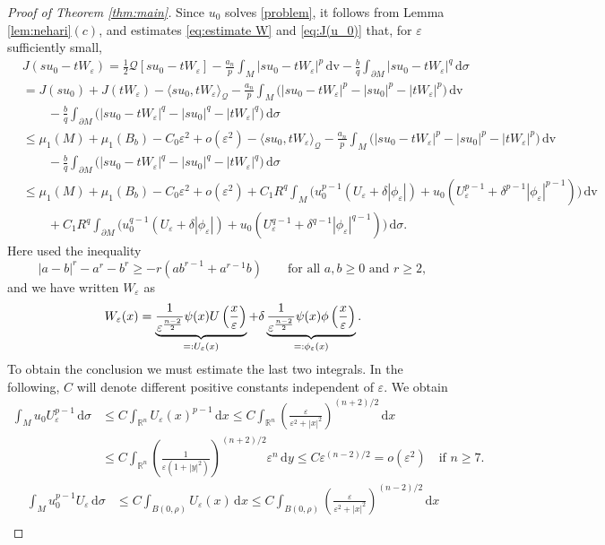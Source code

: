 \documentclass[reqno,11pt,oneside]{amsart}
\numberwithin{equation}{section}
\def\r{\mathbb{R}}
\def\eps{\varepsilon}
\def\im{\int_{M}}
\def\idm{\int_{\partial M}}
\def\d{\,\mathrm{d}}
\def\dv{\,\mathrm{dv}}
\begin{document}
\begin{proof}[Proof of Theorem \ref{thm:main}]
Since $u_0$ solves \eqref{problem}, it follows from Lemma \ref{lem:nehari}$(c)$, and estimates \eqref{eq:estimate W} and \eqref{eq:J(u_0)} that, for $\eps$ sufficiently small,
\begin{align} \label{eq:energy}
&J(su_0-tW_\eps)=\frac{1}{2}\mathscr{Q}[su_0-tW_\eps]-\frac{a_n}{p}\im|su_0-tW_\eps|^p\dv-\frac{b}{q}\idm|su_0-tW_\eps|^q\d\sigma \nonumber \\
&=J(su_0)+J(tW_\eps)-\langle su_0,tW_\eps\rangle_\mathscr{Q}-\frac{a_n}{p}\im\Big(|su_0-tW_\eps|^p-|su_0|^p-|tW_\eps|^p\Big)\dv\nonumber\\
&\qquad-\frac{b}{q}\idm\Big(|su_0-tW_\eps|^q-|su_0|^q-|tW_\eps|^q\Big)\d\sigma  \nonumber \\
&\leq \mu_1(M)+\mu_1(B_b)-C_0\eps^2+o(\eps^2)-\langle su_0,tW_\eps\rangle_\mathscr{Q}-\frac{a_n}{p}\im\Big(|su_0-tW_\eps|^p-|su_0|^p-|tW_\eps|^p\Big)\dv\nonumber\\
&\qquad
-\frac{b}{q}\idm\Big(|su_0-tW_\eps|^q-|su_0|^q-|tW_\eps|^q\Big)\d\sigma\nonumber \\
&\leq  \mu_1(M)+\mu_1(B_b)-C_0\eps^2+o(\eps^2) +C_1R^q
\im\Big(u_0^{p-1}(U_\eps +\delta|\phi_\eps|)+u_0\left(U_\eps^{p-1}+\delta^{p-1}|\phi_\eps|^{p-1}\right)\Big)\dv\nonumber\\
&\qquad+C_1R^q
\idm\Big(u_0^{q-1}(U_\eps +\delta|\phi_\eps|) +u_0\left(U_\eps^{q-1}+\delta^{q-1}|\phi_\eps|^{q-1}\right)\Big)\d\sigma.
\end{align}
Here used the inequality
$$|a-b|^r-a^r-b^r\geq-r(ab^{r-1}+a^{r-1}b)\qquad\text{for all \ }a,b\geq 0\text{ \ and \ } r\geq 2,$$ 
and we have written $W_\eps$ as
$$W_\eps(x)=  \underbrace{\frac 1{\eps^{n-2\over2}}\psi(x)U\left(\frac x\eps\right)}_{=:U_\eps(x)}+ \delta \underbrace{\frac 1{\eps^{n-2\over2}}\psi(x)\phi\left(\frac x\eps\right)}_{=:\phi_\eps(x)}.$$
To obtain the conclusion we must estimate the last two integrals. In the following, $C$ will denote different positive constants independent of $\eps$. We obtain
\begin{align*}
\im u_0U_\eps^{p-1}\d\sigma &\leq C\int_{\r^{n }}U_\eps(x )^{p-1}\d x\leq   C\int_{\r^{n }}\left(\frac{\eps}{\eps^2+|x|^2}\right)^{(n+2)/2}\d x  \\
& \leq C\int_{\r^{n }}\left(\frac{1}{\eps(1+|y|^2)}\right)^{(n+2)/2}\eps^{n }\d y \leq C\eps^{(n-2)/2}=o(\eps^2)\quad\text{if \ }n\geq 7.
\end{align*}
\begin{align*}
\im u_0^{p-1}U_\eps\d\sigma &\leq C\int_{B(0,\rho)}U_\eps(x ) \d x\leq   C\int_{B(0,\rho)}\left(\frac{\eps}{\eps^2+|x|^2}\right)^{(n-2)/2}\d x \\

\end{align*}
\end{proof}
\end{document}
